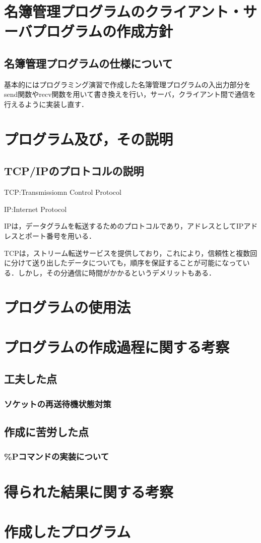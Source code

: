 \documentclass[a4j]{jarticle}
\begin{document}
\section{名簿管理プログラムのクライアント・サーバプログラムの作成方針}

\subsection{名簿管理プログラムの仕様について}
基本的にはプログラミング演習で作成した名簿管理プログラムの入出力部分をsend関数やrecv関数を用いて書き換えを行い，サーバ，クライアント間で通信を行えるように実装し直す．

\section{プログラム及び，その説明}


\subsection{TCP/IPのプロトコルの説明}
TCP:Transmissiomn Control Protocol

IP:Internet Protocol

IPは，データグラムを転送するためのプロトコルであり，アドレスとしてIPアドレスとポート番号を用いる．

TCPは，ストリーム転送サービスを提供しており，これにより，信頼性と複数回に分けて送り出したデータについても，順序を保証することが可能になっている．しかし，その分通信に時間がかかるというデメリットもある．



\section{プログラムの使用法}

\section{プログラムの作成過程に関する考察}

\subsection{工夫した点}
\subsubsection{ソケットの再送待機状態対策}

\subsection{作成に苦労した点}
\subsubsection{\%Pコマンドの実装について}

\section{得られた結果に関する考察}

\section{作成したプログラム}
\end{document}
